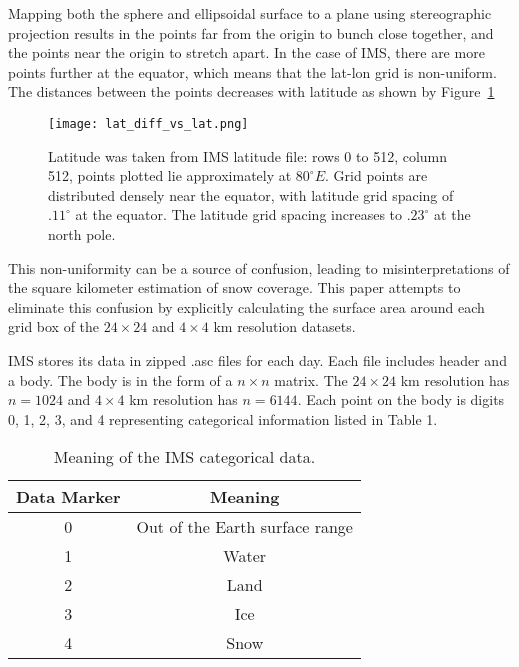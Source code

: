 Mapping both the sphere and ellipsoidal surface to a plane using stereographic projection results in the points far from the origin to bunch close together, and the points near the origin to stretch apart. In the case of IMS, there are more points further at the equator, which means that the lat-lon grid is non-uniform. The distances between the points decreases with latitude as shown by Figure~\ref{fig:lat_diff}

\begin{figure}[ht]
\centering
\begin{minipage}{4.0in}
\texttt{[image: lat\_diff\_vs\_lat.png]}
\caption{Latitude was taken from IMS latitude file: rows 0 to 512, column 512, points plotted lie approximately at $80^{\circ}E$. Grid points are distributed densely near the equator, with latitude grid spacing of $.11^{\circ}$ at the equator. The latitude grid spacing increases to $.23^{\circ}$ at the north pole.}
\label{fig:lat_diff}
\end{minipage}
\end{figure}

This non-uniformity can be a source of confusion, leading to misinterpretations of the square kilometer estimation of snow coverage. This paper attempts to eliminate this confusion by explicitly calculating the surface area around each grid box of the $24 \times 24$ and $4 \times 4$ km resolution datasets.


IMS stores its data in zipped .asc files for each day. Each file includes header and a body. The body is in the form of a $n \times n$ matrix. The $24 \times 24$ km resolution has $n=1024$ and $4 \times 4$ km resolution has $n=6144$. Each point on the body is digits 0, 1, 2, 3, and 4 representing categorical information listed in Table 1. 

\begin{table}[hbt]
\centering
\caption{Meaning of the IMS categorical data.\label{tab1}}
{\begin{tabular}{|c|c|} 
\hline
\textbf{Data Marker} & \textbf{Meaning}
\\ \hline
0 & Out of the Earth surface range
\\ \hline
1 & Water
\\ \hline
2 & Land
\\ \hline
3 & Ice
\\ \hline
4 & Snow
\\ \hline
\end{tabular} }
\end{table}

